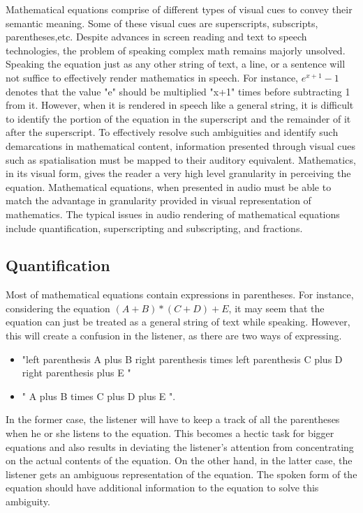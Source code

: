 \documentclass{article}
\begin{document}
Mathematical equations comprise of different types of visual cues to convey their semantic meaning. Some of these visual cues are superscripts, subscripts, parentheses,etc. 
Despite advances in screen reading and text to speech technologies, the problem of speaking complex math remains majorly unsolved. Speaking the equation just as any other string of text, a line, or a sentence will not suffice to effectively render mathematics in speech. For instance, $e^{x+1}-1$ denotes that the value "e" should be multiplied "x+1" times before subtracting 1 from it. However, when it is rendered in speech like a general string, it is difficult to identify the portion of the equation in the superscript and the remainder of it after the superscript.
To effectively resolve such ambiguities and identify such demarcations in mathematical content, information presented through visual cues such as spatialisation must be mapped to their auditory equivalent. Mathematics, in its visual form, gives the reader a very high level granularity in perceiving the equation. Mathematical equations, when presented in audio must be able to match the advantage in granularity provided in visual representation of mathematics.   The typical issues in audio rendering of mathematical equations include quantification, superscripting and subscripting, and fractions.

\subsection{Quantification}
\label{ssec:quantify}
Most of mathematical equations contain expressions in parentheses. For instance, considering the equation
$(A+B)*(C+D)+E$, it may seem that the equation can just be treated as a general string of text while speaking. However, this will create a confusion in the listener, as there are two ways of expressing.
\begin{itemize}
\item  "left parenthesis A plus B right parenthesis times left parenthesis C plus D right parenthesis plus E " 
\item " A plus B times C plus D plus E ". 
\end{itemize}
In the former case, the listener will have to keep a track of all the parentheses when he or she listens to the equation. This becomes a hectic task for bigger equations and also results in deviating the listener's attention from concentrating on the actual contents of the equation. On the other hand, in the latter case, the listener gets an ambiguous representation of the equation. The spoken form of the equation should have additional information to the equation to solve this ambiguity.
\end{document}
